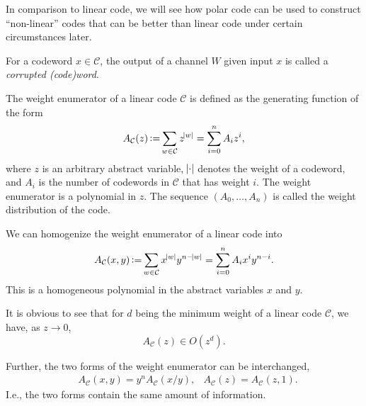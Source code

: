 \begin{remark}
    In comparison to linear code, we will see how polar code can be used to construct ``non-linear'' codes that can be better than linear code under certain circumstances later.
\end{remark}

\begin{definition}
    For a codeword $x\in\mathcal{C}$, the output of a channel $W$ given input $x$ is called a \textit{corrupted (code)word}.    
\end{definition}

\begin{definition}
    The weight enumerator of a linear code $\mathcal{C}$ is defined as the generating function of the form
    \begin{equation}
        A_\mathcal{C}(z) \operatorname{\vcentcolon=} \sum_{w\in\mathcal{C}} z^{\abs{w}} = \sum_{i=0}^n A_i z^i,
    \end{equation}
    where $z$ is an arbitrary abstract variable, $\abs{\cdot}$ denotes the weight of a codeword, and $A_i$ is the number of codewords in $\mathcal{C}$ that has weight $i$. The weight enumerator is a polynomial in $z$. The sequence $(A_0,\ldots,A_n)$ is called the weight distribution of the code.
\end{definition}

\begin{definition}
    We can homogenize the weight enumerator of a linear code into
    \begin{equation}
        A_\mathcal{C}(x,y) \operatorname{\vcentcolon=} \sum_{w\in\mathcal{C}} x^{\abs{w}} y^{n-\abs{w}} = \sum_{i=0}^n A_i x^i y^{n-i}.
    \end{equation}
    This is a homogeneous polynomial in the abstract variables $x$ and $y$.
\end{definition}
It is obvious to see that for $d$ being the minimum weight of a linear code $\mathcal{C}$, we have, as $z\rightarrow 0$,
\begin{equation*}
    A_\mathcal{C}(z)\in O(z^d).
\end{equation*}

Further, the two forms of the weight enumerator can be interchanged,
\begin{align}
    &A_\mathcal{C}(x,y) = y^n A_\mathcal{C}(x/y), &A_\mathcal{C}(z) = A_\mathcal{C}(z,1).
\end{align}
I.e., the two forms contain the same amount of information.

